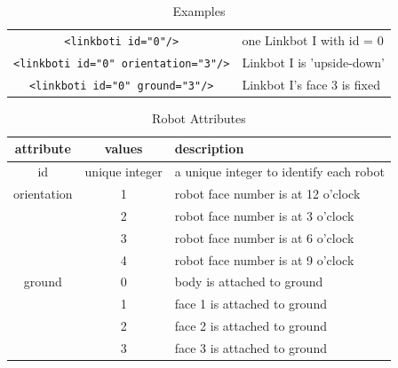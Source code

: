 \documentclass{article}
\begin{document}
\begin{table}[H]
	\begin{center}
	\begin{tabular}{c | l}
		\hline \hline
		\verb|<linkboti id="0"/>| & one Linkbot I with id = 0 \\
		\verb|<linkboti id="0" orientation="3"/>| & Linkbot I is 'upside-down' \\
		\verb|<linkboti id="0" ground="3"/>| & Linkbot I's face 3 is fixed \\
		\hline \hline
	\end{tabular}
	\caption{Examples}
	\label{tab:ex}
	\end{center}
\end{table}

\begin{table}[H]
	\begin{center}
	\begin{tabular}{c | c | l}
		\hline \hline
		\textbf{attribute} & \textbf{values} & \textbf{description} \\ \hline
		id & unique integer & a unique integer to identify each robot \\
		orientation & 1 & robot face number is at 12 o'clock \\
		 & 2 & robot face number is at 3 o'clock \\
		 & 3 & robot face number is at 6 o'clock \\
		 & 4 & robot face number is at 9 o'clock \\
		ground & 0 & body is attached to ground \\
		 & 1 & face 1 is attached to ground \\
		 & 2 & face 2 is attached to ground \\
		 & 3 & face 3 is attached to ground \\
		\hline \hline
	\end{tabular}
	\caption{Robot Attributes}
	\label{tab:attributes}
	\end{center}
\end{table}
\end{document}
